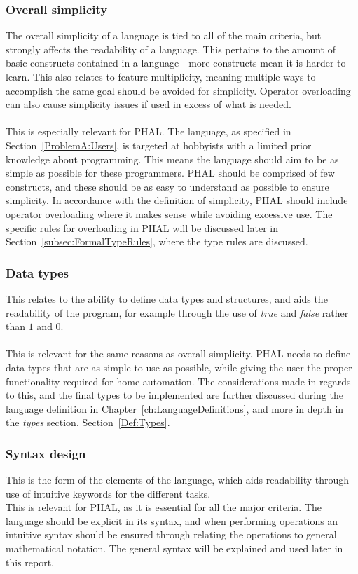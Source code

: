 \subsubsection{Overall simplicity}
The overall simplicity of a language is tied to all of the main criteria, but strongly affects the readability of a language. This pertains to the amount of basic constructs contained in a language - more constructs mean it is harder to learn. This also relates to feature multiplicity, meaning multiple ways to accomplish the same goal should be avoided for simplicity. Operator overloading can also cause simplicity issues if used in excess of what is needed.
\\\\
This is especially relevant for PHAL. The language, as specified in Section~\ref{ProblemA:Users}, is targeted at hobbyists with a limited prior knowledge about programming. This means the language should aim to be as simple as possible for these programmers. PHAL should be comprised of few constructs, and these should be as easy to understand as possible to ensure simplicity. In accordance with the definition of simplicity, PHAL should include operator overloading where it makes sense while avoiding excessive use. The specific rules for overloading in PHAL will be discussed later in Section~\ref{subsec:FormalTypeRules}, where the type rules are discussed.

\subsubsection{Data types}
This relates to the ability to define data types and structures, and aids the readability of the program, for example through the use of \textit{true} and \textit{false} rather than $1$ and $0$.
\\\\
This is relevant for the same reasons as overall simplicity. PHAL needs to define data types that are as simple to use as possible, while giving the user the proper functionality required for home automation. The considerations made in regards to this, and the final types to be implemented are further discussed during the language definition in Chapter~\ref{ch:LanguageDefinitions}, and more in depth in the \textit{types} section, Section~\ref{Def:Types}.

\subsubsection{Syntax design}
This is the form of the elements of the language, which aids readability through use of intuitive keywords for the different tasks. 
\\
This is relevant for PHAL, as it is essential for all the major criteria. The language should be explicit in its syntax, and when performing operations an intuitive syntax should be ensured through relating the operations to general mathematical notation. The general syntax will be explained and used later in this report.

